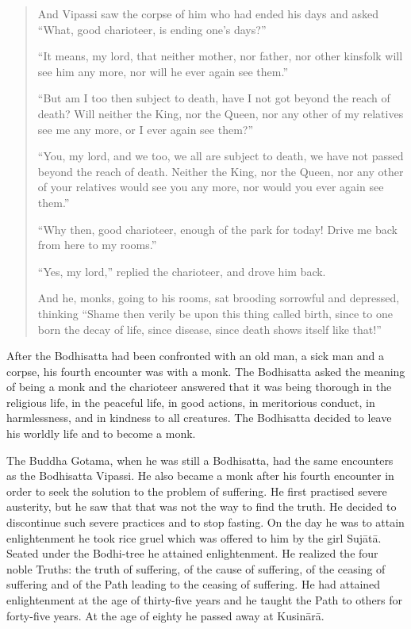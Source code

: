 \documentclass{book}
\begin{document}
\begin{quote}
And Vipassi saw the corpse of him who had ended his days and asked
``What, good charioteer, is ending one's days?''

``It means, my lord, that neither mother, nor father, nor other kinsfolk
will see him any more, nor will he ever again see them.''

``But am I too then subject to death, have I not got beyond the reach of
death? Will neither the King, nor the Queen, nor any other of my
relatives see me any more, or I ever again see them?''

``You, my lord, and we too, we all are subject to death, we have not
passed beyond the reach of death. Neither the King, nor the Queen, nor
any other of your relatives would see you any more, nor would you ever
again see them.''

``Why then, good charioteer, enough of the park for today! Drive me back
from here to my rooms.''

``Yes, my lord,'' replied the charioteer, and drove him back.

And he, monks, going to his rooms, sat brooding sorrowful and depressed,
thinking ``Shame then verily be upon this thing called birth, since to
one born the decay of life, since disease, since death shows itself like
that!''
\end{quote}

After the Bodhisatta had been confronted with an old man, a sick man and
a corpse, his fourth encounter was with a monk. The Bodhisatta asked the
meaning of being a monk and the charioteer answered that it was being
thorough in the religious life, in the peaceful life, in good actions,
in meritorious conduct, in harmlessness, and in kindness to all
creatures. The Bodhisatta decided to leave his worldly life and to
become a monk.

The Buddha Gotama, when he was still a Bodhisatta, had the same
encounters as the Bodhisatta Vipassi. He also became a monk after his
fourth encounter in order to seek the solution to the problem of
suffering. He first practised severe austerity, but he saw that that was
not the way to find the truth. He decided to discontinue such severe
practices and to stop fasting. On the day he was to attain enlightenment
he took rice gruel which was offered to him by the girl Sujātā. Seated
under the Bodhi-tree he attained enlightenment. He realized the four
noble Truths: the truth of suffering, of the cause of suffering, of the
ceasing of suffering and of the Path leading to the ceasing of
suffering. He had attained enlightenment at the age of thirty-five years
and he taught the Path to others for forty-five years. At the age of
eighty he passed away at Kusinārā.
\end{document}
